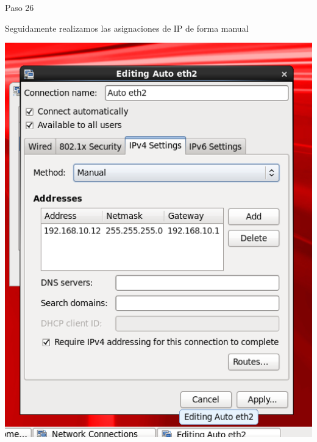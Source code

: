 \begin{itemize}
\begin{center}
    Paso 26
\end{center}

    Seguidamente realizamos las asignaciones de IP de forma manual\\
	\begin{center}
	\includegraphics[width=15cm]{./Imagenes/imagen26} 
	\end{center}

\end{itemize} 

